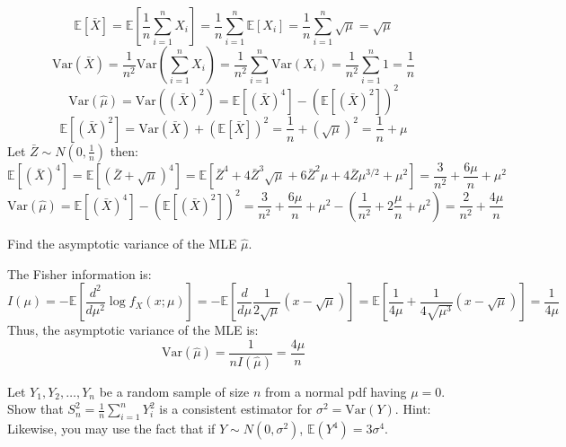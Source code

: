 \documentclass{article}
\newcommand{\E}{\mathbb{E}}
\newcommand{\V}{\text{Var}}
\begin{document}
\begin{probset}
\begin{prob}
\begin{subprobset}
\begin{subprob}
        \begin{soln}
            \[
                \E[\bar{X}] = \E\left[\frac{1}{n} \sum_{i=1}^n X_i \right] = \frac{1}{n} \sum_{i=1}^n \E[X_i] = \frac{1}{n} \sum_{i=1}^n \sqrt{\mu} = \sqrt{\mu}
            \]
            \[
                \V(\bar{X}) = \frac{1}{n^2} \V\left(\sum_{i=1}^n X_i \right) = \frac{1}{n^2} \sum_{i=1}^n \V(X_i) = \frac{1}{n^2} \sum_{i=1}^n 1 = \frac{1}{n}
            \]
            \[
                \V(\hat\mu) = \V((\bar{X})^2) = \E[(\bar{X})^4] - (\E[(\bar{X})^2])^2
            \]
            \[
                \E[(\bar{X})^2] = \V(\bar{X}) + (\E[\bar{X}])^2 = \frac{1}{n} + (\sqrt{\mu})^2 = \frac{1}{n} + \mu
            \]
            Let $\bar{Z} \sim N(0, \frac{1}{n})$ then:
            \[
                \E[(\bar{X})^4] = \E[(\bar{Z} + \sqrt{\mu})^4] = \E[\bar{Z}^4 + 4\bar{Z}^3\sqrt{\mu} + 6\bar{Z}^2\mu + 4\bar{Z}\mu^{3/2} + \mu^2] = \frac{3}{n^2} + \frac{6\mu}{n} + \mu^2
            \]
            \[
                \V(\hat\mu) = \E[(\bar{X})^4] - (\E[(\bar{X})^2])^2 = \frac{3}{n^2} + \frac{6\mu}{n} + \mu^2 - \left(\frac{1}{n^2} + 2\frac{\mu}{n} + \mu^2\right) = \frac{2}{n^2} + \frac{4\mu}{n}
            \]
        \end{soln}
    \end{subprob}

    \begin{subprob}
        Find the asymptotic variance of the MLE $\hat\mu$.

        \begin{soln}
            The Fisher information is:
            \[
                I(\mu) = -\E\left[\frac{d^2}{d\mu^2} \log f_X(x; \mu)\right] = -\E\left[\frac{d}{d\mu} \frac{1}{2\sqrt{\mu}}(x - \sqrt{\mu}) \right] = \E\left[\frac{1}{4\mu}+\frac{1}{4\sqrt{\mu^{3}}}\left(x-\sqrt{\mu}\right) \right] = \frac{1}{4\mu}
            \]
            Thus, the asymptotic variance of the MLE is:
            \[
                \V(\hat\mu) = \frac{1}{nI(\hat\mu)} = \frac{4\mu}{n}
            \]
        \end{soln}
    \end{subprob}
    \end{subprobset}
\end{prob}

\newpage

\begin{prob}[\textbf{5.7.2}]
    Let $Y_1, Y_2, \dots, Y_n$ be a random sample of size $n$ from a normal pdf having $\mu = 0$. Show that $S^2_n = \frac{1}{n} \sum_{i=1}^n Y_i^2$ is a consistent estimator for $\sigma^2 = \V(Y)$. Hint: Likewise, you may use the fact that if $Y \sim N (0, \sigma^2)$, $\E(Y^4) = 3\sigma^4$.


\end{prob}
\end{probset}
\end{document}
